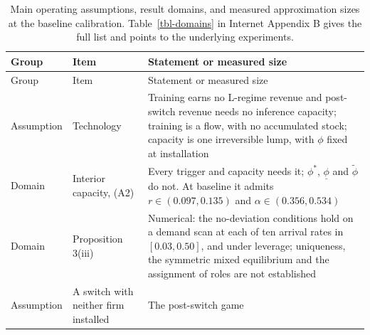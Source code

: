 \documentclass[
  11pt,
  letterpaper,
]{scrartcl}
\begin{document}
\begin{longtable}[]{@{}
  >{\raggedright\arraybackslash}p{}
  >{\raggedright\arraybackslash}p{}
  >{\raggedright\arraybackslash}p{}@{}}
\caption{Main operating assumptions, result domains, and measured
approximation sizes at the baseline calibration. Table~\ref{tbl-domains}
in Internet Appendix B gives the full list and points to the underlying
experiments.}\label{tbl-conventions}\tabularnewline
\toprule\noalign{}
\begin{minipage}[b]{\linewidth}\raggedright
Group
\end{minipage} & \begin{minipage}[b]{\linewidth}\raggedright
Item
\end{minipage} & \begin{minipage}[b]{\linewidth}\raggedright
Statement or measured size
\end{minipage} \\
\midrule\noalign{}
\endfirsthead
\toprule\noalign{}
\begin{minipage}[b]{\linewidth}\raggedright
Group
\end{minipage} & \begin{minipage}[b]{\linewidth}\raggedright
Item
\end{minipage} & \begin{minipage}[b]{\linewidth}\raggedright
Statement or measured size
\end{minipage} \\
\midrule\noalign{}
\endhead
\bottomrule\noalign{}
\endlastfoot
Assumption & Technology & Training earns no L-regime revenue and
post-switch revenue needs no inference capacity; training is a flow,
with no accumulated stock; capacity is one irreversible lump, with
\(\phi\) fixed at installation \\
Domain & Interior capacity, (A2) & Every trigger and capacity needs it;
\(\phi^*\), \(\underline{\phi}\) and \(\tilde{\phi}\) do not. At
baseline it admits \(r \in (0.097, 0.135)\) and
\(\alpha \in (0.356, 0.534)\) \\
Domain & Proposition 3(iii) & Numerical: the no-deviation conditions
hold on a demand scan at each of ten arrival rates in \([0.03, 0.50]\),
and under leverage; uniqueness, the symmetric mixed equilibrium and the
assignment of roles are not established \\
Assumption & A switch with neither firm installed & The post-switch game

\end{longtable}
\end{document}
